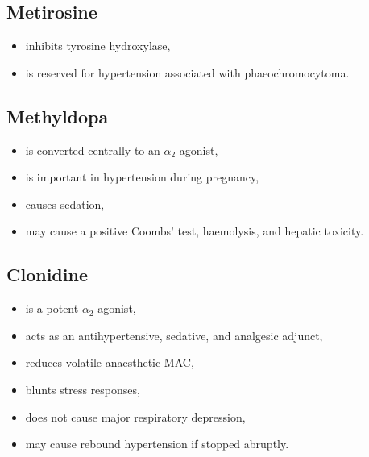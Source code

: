 \documentclass[11pt,a4paper]{article}
\begin{document}
\subsection{Metirosine}
\begin{itemize}
    \item inhibits tyrosine hydroxylase,
    \item is reserved for hypertension associated with phaeochromocytoma.
\end{itemize}

\subsection{Methyldopa}
\begin{itemize}
    \item is converted centrally to an $\alpha_2$-agonist,
    \item is important in hypertension during pregnancy,
    \item causes sedation,
    \item may cause a positive Coombs' test, haemolysis, and hepatic toxicity.
\end{itemize}

\subsection{Clonidine}
\begin{itemize}
    \item is a potent $\alpha_2$-agonist,
    \item acts as an antihypertensive, sedative, and analgesic adjunct,
    \item reduces volatile anaesthetic MAC,
    \item blunts stress responses,
    \item does not cause major respiratory depression,
    \item may cause rebound hypertension if stopped abruptly.
\end{itemize}
\end{document}
